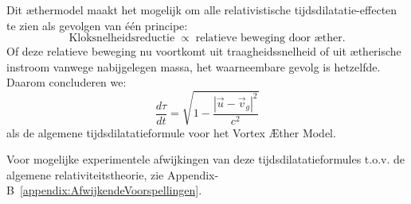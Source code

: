 Dit æthermodel maakt het mogelijk om alle relativistische tijdsdilatatie-effecten te zien als gevolgen van één principe:
\[
    \text{Kloksnelheidsreductie} \;\propto\; \text{relatieve beweging door æther}.
\]
Of deze relatieve beweging nu voortkomt uit traagheidssnelheid of uit ætherische instroom vanwege nabijgelegen massa, het waarneembare gevolg is hetzelfde. Daarom concluderen we:
\[
    \boxed{\frac{d\tau}{dt} = \sqrt{1 - \frac{|\vec{u} - \vec{v}_g|^2}{c^2}}}
\]
als de algemene tijdsdilatatieformule voor het Vortex Æther Model.

Voor mogelijke experimentele afwijkingen van deze tijdsdilatatieformules t.o.v. de algemene relativiteitstheorie, zie Appendix-B~\ref{appendix:AfwijkendeVoorspellingen}.
